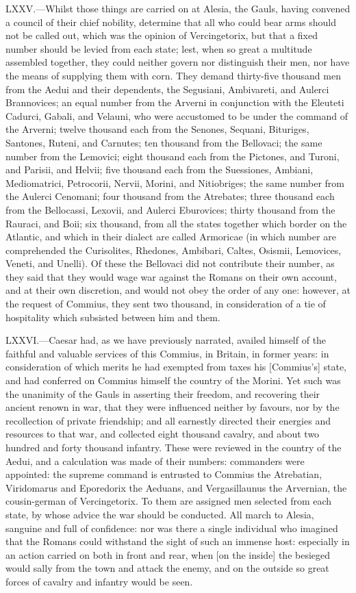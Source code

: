 LXXV.—Whilst those things are carried on at Alesia, the Gauls, having
convened a council of their chief nobility, determine that all who could
bear arms should not be called out, which was the opinion of
Vercingetorix, but that a fixed number should be levied from each state;
lest, when so great a multitude assembled together, they could neither
govern nor distinguish their men, nor have the means of supplying them
with corn. They demand thirty-five thousand men from the Aedui and their
dependents, the Segusiani, Ambivareti, and Aulerci Brannovices; an equal
number from the Arverni in conjunction with the Eleuteti Cadurci,
Gabali, and Velauni, who were accustomed to be under the command of the
Arverni; twelve thousand each from the Senones, Sequani, Bituriges,
Santones, Ruteni, and Carnutes; ten thousand from the Bellovaci; the
same number from the Lemovici; eight thousand each from the Pictones,
and Turoni, and Parisii, and Helvii; five thousand each from the
Suessiones, Ambiani, Mediomatrici, Petrocorii, Nervii, Morini, and
Nitiobriges; the same number from the Aulerci Cenomani; four thousand
from the Atrebates; three thousand each from the Bellocassi, Lexovii,
and Aulerci Eburovices; thirty thousand from the Rauraci, and Boii; six
thousand, from all the states together which border on the Atlantic, and
which in their dialect are called Armoricae (in which number are
comprehended the Curisolites, Rhedones, Ambibari, Caltes, Osismii,
Lemovices, Veneti, and Unelli). Of these the Bellovaci did not
contribute their number, as they said that they would wage war against
the Romans on their own account, and at their own discretion, and would
not obey the order of any one: however, at the request of Commius, they
sent two thousand, in consideration of a tie of hospitality which
subsisted between him and them.

LXXVI.—Caesar had, as we have previously narrated, availed himself of
the faithful and valuable services of this Commius, in Britain, in
former years: in consideration of which merits he had exempted from
taxes his [Commius's] state, and had conferred on Commius himself the
country of the Morini. Yet such was the unanimity of the Gauls in
asserting their freedom, and recovering their ancient renown in war,
that they were influenced neither by favours, nor by the recollection of
private friendship; and all earnestly directed their energies and
resources to that war, and collected eight thousand cavalry, and about
two hundred and forty thousand infantry. These were reviewed in the
country of the Aedui, and a calculation was made of their numbers:
commanders were appointed: the supreme command is entrusted to Commius
the Atrebatian, Viridomarus and Eporedorix the Aeduans, and
Vergasillaunus the Arvernian, the cousin-german of Vercingetorix. To
them are assigned men selected from each state, by whose advice the war
should be conducted. All march to Alesia, sanguine and full of
confidence: nor was there a single individual who imagined that the
Romans could withstand the sight of such an immense host: especially in
an action carried on both in front and rear, when [on the inside] the
besieged would sally from the town and attack the enemy, and on the
outside so great forces of cavalry and infantry would be seen.

